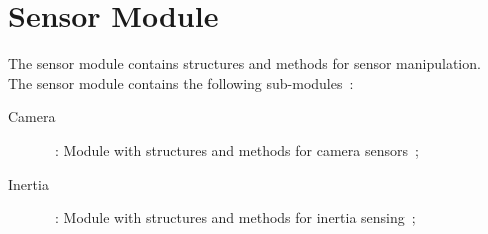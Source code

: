 \chapter{Sensor Module}
\label{cha:sensor}
The sensor module contains structures and methods for sensor manipulation.\\

The sensor module contains the following sub-modules~:

\begin{description}
  \item[Camera ]~: Module with structures and methods for camera sensors~;
  \item[Inertia]~: Module with structures and methods for inertia sensing~;
\end{description}




